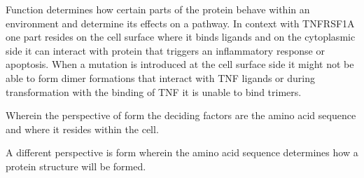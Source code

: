 	Function determines how certain parts of the protein behave within an environment and determine its effects on a pathway. In context with TNFRSF1A one part resides on the cell surface where it binds ligands and on the cytoplasmic side it can interact with protein that triggers an inflammatory response or apoptosis. When a mutation is introduced at the cell surface side it might not be able to form dimer formations that interact with TNF ligands or during transformation with the binding of TNF it is unable to bind trimers. 
	
	Wherein the perspective of form the deciding factors are the amino acid sequence and where it resides within the cell.
	
	A different perspective is form wherein the amino acid sequence determines how a protein structure will be formed.
	
%	
%	
%	
%	
%	
%	
	
	
	
	
	



